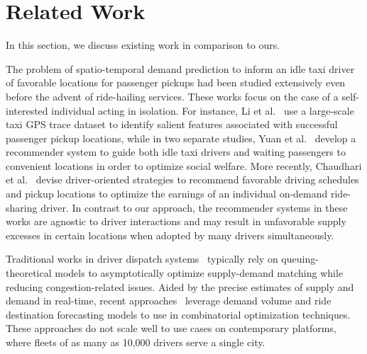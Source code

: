 \section{Related Work}
\label{sec:related_work}

In this section, we discuss existing work in comparison to ours.

The problem of spatio-temporal demand prediction 
    to inform an idle taxi driver of favorable locations for passenger
    pickups had been studied extensively even before the advent of ride-hailing
    services. 
These works focus on the case of a self-interested individual acting in isolation.
For instance, Li et al.~\cite{Li2011-qm} use a
    large-scale taxi GPS trace dataset to identify salient features associated
    with successful passenger pickup locations, while in two separate studies, 
    Yuan et al.~\cite{Yuan2011-pd, Yuan2013-gj} develop a recommender
    system to guide both idle taxi drivers and waiting passengers to convenient
    locations in order to optimize social welfare.
More recently, Chaudhari et al.~\cite{Chaudhari2018-cv} devise driver-oriented strategies to
    recommend favorable driving schedules and pickup locations
    to optimize the earnings of an individual on-demand ride-sharing driver.
In contrast to our approach, the recommender systems in these works 
    are agnostic to driver interactions
    and may result in unfavorable supply excesses in certain locations
    when adopted by many drivers simultaneously.

Traditional works in driver dispatch systems~\cite{Lee2004-hh, Zhang2016-vz,
    Seow2010-qg} typically rely on queuing-theoretical models to asymptotically
    optimize supply-demand matching while reducing congestion-related issues.
Aided by the precise estimates of supply and
    demand in real-time, recent approaches~\cite{Xu2018-xb, Zhang2017-id} 
    leverage
    demand volume and ride destination forecasting models to use in
    combinatorial optimization techniques.
These approaches do not scale well to use cases on contemporary platforms,
    where fleets of as many as 10,000 drivers serve a single city. 


